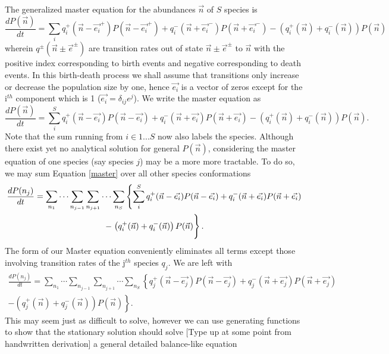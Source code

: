 \documentclass[11pt,a4paper,final]{iopart}
\begin{document}
The generalized master equation for the abundances $\vec{n}$ of $S$ species is
\begin{equation*}
\frac{dP(\vec{n})}{dt}=\sum_i q^+_i(\vec{n}-\vec{e_i}^+)P(\vec{n}-\vec{e_i}^+) + q^-_i(\vec{n}+\vec{e_i}^-)P(\vec{n}+\vec{e_i}^-) - ( q^+_i(\vec{n})+q^-_i(\vec{n}))P(\vec{n})
\end{equation*}
wherein $q^{\pm}(\vec{n} \pm \vec{e}^{\pm})$ are transition rates out of state $\vec{n} \pm \vec{e}^{\pm}$ to $\vec{n}$ with the positive index corresponding to birth events and negative corresponding to death events.
In this birth-death process we shall assume that transitions only increase or decrease the population size by one, hence $\vec{e_i}$ is a vector of zeros except for the i$^{th}$ component which is 1 ($\vec{e_i}=\delta_{ij}e^j$). 
We write the master equation as 
\begin{equation}\label{master}
\frac{dP(\vec{n})}{dt}=\sum_i^S q^+_i(\vec{n}-\vec{e_i})P(\vec{n}-\vec{e_i}) + q^-_i(\vec{n}+\vec{e_i})P(\vec{n}+\vec{e_i}) - \left( q^+_i(\vec{n})+q^-_i(\vec{n}) \right) P(\vec{n}).
\end{equation}
Note that the sum running from $i\in 1...S $ now also labels the species.
Although there exist yet no analytical solution for general $P(\vec{n})$, considering the master equation of one species (say species $j$) may be a more more tractable.
To do so, we may sum Equation \ref{master} over all other species conformations
\begin{multline*}\label{master}
\frac{dP(n_j)}{dt}=\sum_{n_1} \cdots \sum_{n_{j-1}}\sum_{n_{j+1}} \cdots \sum_{n_S} \left\lbrace\sum_i^S q^+_i(\vec{n}-\vec{e_i})P(\vec{n}-\vec{e_i}) + q^-_i(\vec{n}+\vec{e_i})P(\vec{n}+\vec{e_i}) \right. \\ 
- \left. \left( q^+_i(\vec{n})+q^-_i(\vec{n}) \right) P(\vec{n})\vphantom{\sum_i}\right\rbrace .
\end{multline*}
The form of our Master equation conveniently eliminates all terms except those involving transition rates of the j$^{th}$ species $q_j$.
We are left with 
\begin{multline*}
\frac{dP(n_j)}{dt}=\sum_{n_1} \cdots \sum_{n_{j-1}}\sum_{n_{j+1}} \cdots \sum_{n_S} \left\lbrace q^+_j(\vec{n}-\vec{e_j})P(\vec{n}-\vec{e_j}) + q^-_j(\vec{n}+\vec{e_j})P(\vec{n}+\vec{e_j}) \right. \\ 
- \left. \left( q^+_j(\vec{n})+q^-_j(\vec{n}) \right) P(\vec{n}) \right\rbrace .
\end{multline*}
This may seem just as difficult to solve, however we can use generating functions to show that the stationary solution should solve [Type up at some point from handwritten derivation] a general detailed balance-like equation
\end{document}

